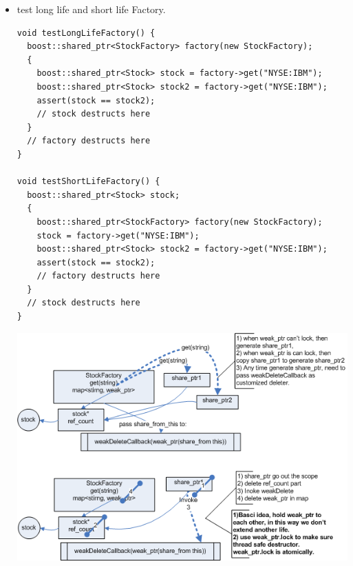 \documentclass[a4paper,11pt,twoside]{book}
\begin{document}
\begin{itemize}
\begin{lstlisting}
private:
static void weakDeleteCallback(const boost::weak_ptr<StockFactory>& wkFactory, Stock* stock) {
    printf("weakDeleteStock[%p]\n", stock);
    boost::shared_ptr<StockFactory> factory(wkFactory.lock());
    if (factory) {
      factory->removeStock(stock);
    }
    else {
      printf("factory died.\n");
    }
    delete stock;  // sorry, I lied
  }

  void removeStock(Stock* stock) {
    if (stock) {
      muduo::MutexLockGuard lock(mutex_);
      auto it = stocks_.find(stock->key());
      if (it != stocks_.end() && it->second.expired()) {
        stocks_.erase(stock->key());
      }
    }
  }

 private:
  mutable muduo::MutexLock mutex_;
  std::map<string, boost::weak_ptr<Stock> > stocks_;
};
\end{lstlisting}

		\item test long life and short life Factory.
\begin{lstlisting}
void testLongLifeFactory() {
  boost::shared_ptr<StockFactory> factory(new StockFactory);
  {
    boost::shared_ptr<Stock> stock = factory->get("NYSE:IBM");
    boost::shared_ptr<Stock> stock2 = factory->get("NYSE:IBM");
    assert(stock == stock2);
    // stock destructs here
  }
  // factory destructs here
}

void testShortLifeFactory() {
  boost::shared_ptr<Stock> stock;
  {
    boost::shared_ptr<StockFactory> factory(new StockFactory);
    stock = factory->get("NYSE:IBM");
    boost::shared_ptr<Stock> stock2 = factory->get("NYSE:IBM");
    assert(stock == stock2);
    // factory destructs here
  }
  // stock destructs here
}
\end{lstlisting}
	\begin{center}	
		\includegraphics[width=0.90\linewidth]{pics/weak_ptr.png}
		\end{center}

\end{itemize}
\end{document}
